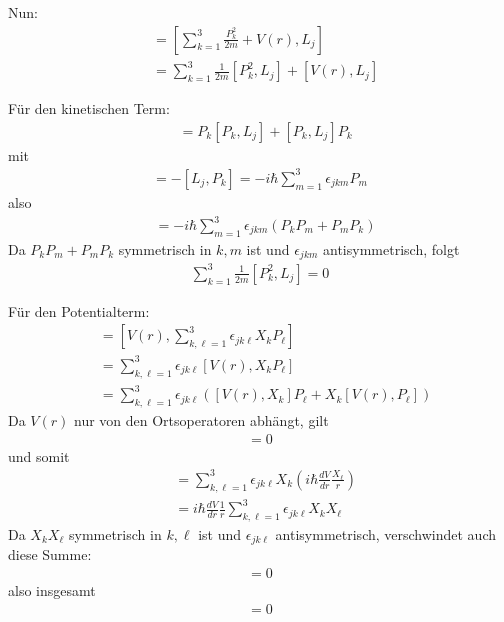 \documentclass[11pt,a4paper]{scrartcl}
\begin{document}
\begin{enumerate}[label=(\alph*)]
\begin{tcolorbox}[title=Berechnung, breakable]
        Nun:
        \begin{align*}
            [H,L_j] &= \left[\sum\limits_{k=1}^3 \frac{P_k^2}{2m} + V(r),L_j\right]\\
            &= \sum\limits_{k=1}^3 \frac{1}{2m}[P_k^2,L_j] + [V(r),L_j]
        \end{align*}

        Für den kinetischen Term:
        \begin{align*}
            [P_k^2,L_j] &= P_k[P_k,L_j] + [P_k,L_j]P_k
        \end{align*}
        mit
        \begin{align*}
            [P_k,L_j] = -[L_j,P_k] = -i\hbar \sum\limits_{m=1}^3 \epsilon_{jkm}P_m
        \end{align*}
        also
        \begin{align*}
            [P_k^2,L_j]
            &= -i\hbar \sum\limits_{m=1}^3 \epsilon_{jkm}(P_kP_m + P_mP_k)
        \end{align*}
        Da $P_kP_m + P_mP_k$ symmetrisch in $k,m$ ist und $\epsilon_{jkm}$ antisymmetrisch, folgt
        \begin{align*}
            \sum\limits_{k=1}^3 \frac{1}{2m}[P_k^2,L_j] = 0
        \end{align*}

        Für den Potentialterm:
        \begin{align*}
            [V(r),L_j]
            &= \left[V(r),\sum\limits_{k,\ell=1}^3 \epsilon_{jk\ell}X_kP_\ell\right]\\
            &= \sum\limits_{k,\ell=1}^3 \epsilon_{jk\ell}[V(r),X_kP_\ell]\\
            &= \sum\limits_{k,\ell=1}^3 \epsilon_{jk\ell}\left([V(r),X_k]P_\ell + X_k[V(r),P_\ell]\right)
        \end{align*}
        Da $V(r)$ nur von den Ortsoperatoren abhängt, gilt
        \begin{align*}
            [V(r),X_k] = 0
        \end{align*}
        und somit
        \begin{align*}
            [V(r),L_j]
            &= \sum\limits_{k,\ell=1}^3 \epsilon_{jk\ell}X_k \left(i\hbar \frac{dV}{dr}\frac{X_\ell}{r}\right)\\
            &= i\hbar \frac{dV}{dr}\frac{1}{r}\sum\limits_{k,\ell=1}^3 \epsilon_{jk\ell}X_kX_\ell
        \end{align*}
        Da $X_kX_\ell$ symmetrisch in $k,\ell$ ist und $\epsilon_{jk\ell}$ antisymmetrisch, verschwindet auch diese Summe:
        \begin{align*}
            [V(r),L_j] = 0
        \end{align*}
        also insgesamt
        \begin{align*}
            [H,L_j] = 0
        \end{align*}


\end{tcolorbox}
\end{enumerate}
\end{document}
